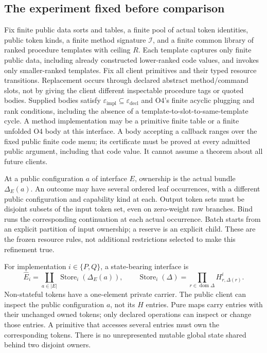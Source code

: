 \documentclass[11pt,a4paper]{article}
\theoremstyle{definition}
\newcommand{\Store}{\operatorname{Store}}
\begin{document}
\subsection{The experiment fixed before comparison}
Fix finite public data sorts and tables, a finite pool of actual token
identities, public token kinds, a finite method signature $\mathcal I$,
and a finite common library of ranked procedure templates with ceiling
$R$. Each template captures only finite public data, including already
constructed lower-ranked code values, and invokes only smaller-ranked
templates. Fix all client primitives and their typed resource transitions.
Replacement occurs through declared abstract method/command slots, not
by giving the client different inspectable procedure tags or quoted
bodies. Supplied bodies satisfy $\varepsilon_{\mathrm{impl}}\subseteq
\varepsilon_{\mathrm{decl}}$ and O4's finite acyclic plugging and rank
conditions, including the absence of a template-to-slot-to-same-template
cycle.
A method implementation may be a primitive finite table or a finite
unfolded O4 body at this interface. A body accepting a callback ranges
over the fixed public finite code menu; its certificate must be proved
at every admitted public argument, including that code value. It cannot
assume a theorem about all future clients.

At a public configuration $a$ of interface $E$, ownership is the actual
bundle $\Delta_E(a)$. An outcome may have several ordered leaf
occurrences, with a different public configuration and capability kind
at each. Output token sets must be disjoint subsets of the input token
set, even on zero-weight raw branches. Bind runs the corresponding
continuation at each actual occurrence. Batch starts from an explicit
partition of input ownership; a reserve is an explicit child. These are
the frozen resource rules, not additional restrictions selected to make
this refinement true.

For implementation $i\in\{P,Q\}$, a state-bearing interface is
\begin{equation}\label{eq:expanded}
 \widehat E_i=\coprod_{a\in|E|}\Store_i(\Delta_E(a)),
 \qquad
 \Store_i(\Delta)=\prod_{r\in\operatorname{dom}\Delta}
                         H^i_{r,\Delta(r)}.
\end{equation}
Non-stateful tokens have a one-element private carrier. The public client
can inspect the public configuration $a$, not its $H$ entries. Pure maps carry entries with their
unchanged owned tokens; only declared operations can inspect or change
those entries. A primitive that accesses several entries must own the
corresponding tokens. There is no unrepresented mutable global state
shared behind two disjoint owners.
\end{document}
